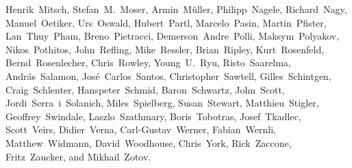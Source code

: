 \begin{flushleft}
  Henrik~Mitsch,          %
  Stefan~M.~Moser,        %
  Armin~M\"uller,		%
  Philipp~Nagele,         %
  Richard~Nagy,           %
  Manuel~Oetiker,         %
  Urs~Oswald,             %
  Hubert~Partl,           %
  Marcelo~Pasin,          %
  Martin~Pfister,		%
  Lan~Thuy~Pham,          %
  Breno~Pietracci,        %
  Demerson~Andre~Polli,   %
  Maksym~Polyakov,        %
  Nikos~Pothitos,		%
  John~Refling,           %
  Mike~Ressler,           %
  Brian~Ripley,           %
  Kurt~Rosenfeld,		%
  Bernd~Rosenlecher,      %
  Chris~Rowley,           %
  Young~U.~Ryu,           %
  Risto~Saarelma,         %
  Andr{\'a}s~Salamon,     %
  Jos\'e~Carlos~Santos,   %
  Christopher~Sawtell,    %
  Gilles~Schintgen,       %
  Craig~Schlenter,        %
  Hanspeter~Schmid,       %
  Baron~Schwartz,         %
  John~Scott,             %
  Jordi~Serra~i~Solanich, %
  Miles~Spielberg,        %
  Susan~Stewart,
  Matthieu~Stigler,
  Geoffrey~Swindale,      %
  Laszlo~Szathmary,       %
  Boris~Tobotras,         %
  Josef~Tkadlec,          %
  Scott~Veirs,            %
  Didier~Verna,           %
  Carl-Gustav~Werner,     %
  Fabian~Wernli,          %
  Matthew~Widmann,        %
  David~Woodhouse,        %
  Chris~York,             %
  Rick~Zaccone,           %
  Fritz~Zaucker,          %
  and Mikhail~Zotov.      %
\end{flushleft}


\pagebreak
\endinput
%

